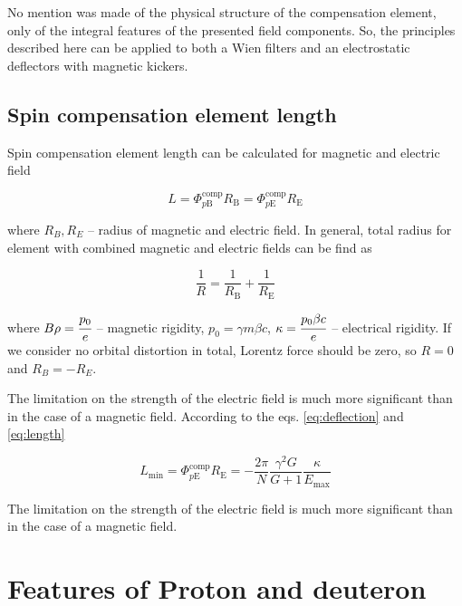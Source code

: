 \documentclass[submitting]{nst}
\begin{document}
\par No mention was made of the physical structure of the compensation element, only of the integral features of the presented field components. So, the principles described here can be applied to both a Wien filters and an electrostatic deflectors with magnetic kickers.

\subsection{Spin compensation element length}

Spin compensation element length can be calculated for magnetic and electric field

\begin{equation}
	L = \Phi_{p\text{B}}^{\text{comp}}R_{\text{B}} = \Phi_{p\text{E}}^{\text{comp}}R_{\text{E}}
	\label{eq:length}
\end{equation}

\noindent where $R_{B}, R_{E}$ -- radius of magnetic and electric field. In general, total radius for element with combined magnetic and electric fields can be find as

\begin{equation}
	\frac{1}{R} = \frac{1}{R_{\text{B}}}+\frac{1}{R_{\text{E}}}
	\label{eq:total_radius}
\end{equation}

\noindent where $B\rho = \cfrac{p_{0}}{e}$ -- magnetic rigidity, $p_{0} = \gamma m\beta c$, $\kappa = \cfrac{p_{0}\beta c}{e}$ -- electrical rigidity. If we consider no orbital distortion in total, Lorentz force should be zero, so $R=0$ and $R_{B} = -R_{E}$.

The limitation on the strength of the electric field is much more significant than in the case of a magnetic field. According to the eqs. \ref{eq:deflection} and \ref{eq:length}

\begin{equation}
	L_{\text{min}} = \Phi_{p\text{E}}^{\text{comp}}R_{\text{E}} = - \frac{2\pi}{N}\frac{\gamma^2 G}{G+1}\frac{\kappa}{E_{\text{max}}}
	\label{eq:length_min}
\end{equation}

\par The limitation on the strength of the electric field is much more significant than in the case of a magnetic field.

\section{Features of Proton and deuteron}\label{sec.III}
\end{document}
